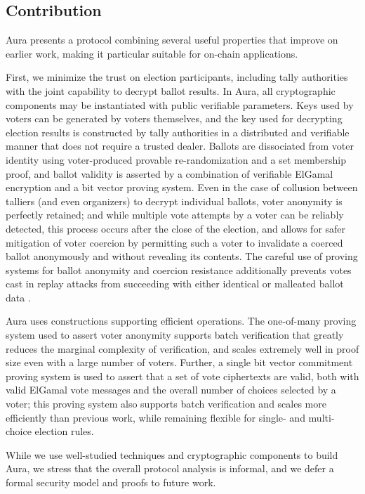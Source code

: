 \documentclass{llncs}
\begin{document}
\subsection{Contribution}

Aura presents a protocol combining several useful properties that improve on earlier work, making it particular suitable for on-chain applications.

First, we minimize the trust on election participants, including tally authorities with the joint capability to decrypt ballot results.
In Aura, all cryptographic components may be instantiated with public verifiable parameters.
Keys used by voters can be generated by voters themselves, and the key used for decrypting election results is constructed by tally authorities in a distributed and verifiable manner that does not require a trusted dealer.
Ballots are dissociated from voter identity using voter-produced provable re-randomization and a set membership proof, and ballot validity is asserted by a combination of verifiable ElGamal encryption and a bit vector proving system.
Even in the case of collusion between talliers (and even organizers) to decrypt individual ballots, voter anonymity is perfectly retained; and while multiple vote attempts by a voter can be reliably detected, this process occurs after the close of the election, and allows for safer mitigation of voter coercion by permitting such a voter to invalidate a coerced ballot anonymously and without revealing its contents.
The careful use of proving systems for ballot anonymity and coercion resistance additionally prevents votes cast in replay attacks from succeeding with either identical or malleated ballot data \cite{replay}.

Aura uses constructions supporting efficient operations.
The one-of-many proving system used to assert voter anonymity supports batch verification that greatly reduces the marginal complexity of verification, and scales extremely well in proof size even with a large number of voters.
Further, a single bit vector commitment proving system is used to assert that a set of vote ciphertexts are valid, both with valid ElGamal vote messages and the overall number of choices selected by a voter; this proving system also supports batch verification and scales more efficiently than previous work, while remaining flexible for single- and multi-choice election rules.

While we use well-studied techniques and cryptographic components to build Aura, we stress that the overall protocol analysis is informal, and we defer a formal security model and proofs to future work.
\end{document}
